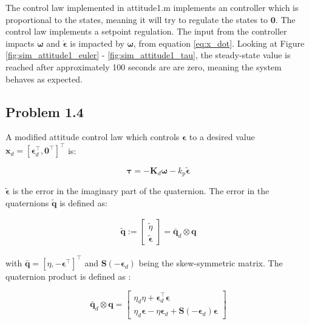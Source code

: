 The control law implemented in {\color{blue} attitude1.m} implements an  controller which is proportional to the states, meaning it will try to regulate  the states to $\mathbf{0}$. The control law implements a setpoint regulation. The input from the controller impacts $\boldsymbol{\omega}$ and  $\dot{\boldsymbol{\epsilon}}$ is impacted by $\boldsymbol{\omega}$, from equation \eqref{eq:x_dot}.   Looking at Figure \ref{fig:sim_attitude1_euler} - \ref{fig:sim_attitude1_tau}, the steady-state value is reached after approximately 100 seconds are are zero, meaning the system behaves as expected. 


\subsection*{Problem 1.4}
A modified attitude control law which controls $\boldsymbol{\epsilon}$ to a desired value $\mathbf{x}_d = [\boldsymbol{\epsilon}_d^\top,  \boldsymbol{0}^\top]^\top$ is:

\begin{equation}
    \boldsymbol{\tau} = - \mathbf{K}_d \boldsymbol{\omega} - k_p \tilde{\boldsymbol{\epsilon}}
    \label{eq:control_law_attitude2}
\end{equation}

$\tilde{\boldsymbol{\epsilon}}$ is the error in the imaginary part of the quaternion. The error in the quaternions $\tilde{\mathbf{q}}$ is defined as:

\begin{equation}
    \begin{aligned}
    \tilde{\boldsymbol{q}}
    :=
    \begin{bmatrix}
    \tilde{\eta} \\
    \tilde{\boldsymbol{\epsilon}}
    \end{bmatrix}
    =
    \bar{\boldsymbol{q}}_d \otimes \boldsymbol{q}
    \label{eq:q_tilde}
    \end{aligned}
\end{equation}

with $\bar{\mathbf{q}} = [\eta, -\boldsymbol{\epsilon}^\top] ^\top$ and $\mathbf{S}(-\boldsymbol{\epsilon}_d)$ being the skew-symmetric matrix. The quaternion product is defined as :

\begin{equation}
    \bar{\boldsymbol{q}}_d \otimes \boldsymbol{q}
    =
    \begin{bmatrix}
    \eta_{d} \eta + \boldsymbol{\epsilon}_d^\top \boldsymbol{\epsilon} \\
    \eta_d \boldsymbol{\epsilon} - \eta \boldsymbol{\epsilon}_d + \mathbf{S}(-\boldsymbol{\epsilon}_d) \boldsymbol{\epsilon}
    \end{bmatrix}
    \label{eq:q_product}
\end{equation}

